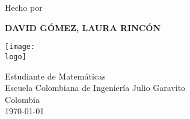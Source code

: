 \documentclass[twoside]{article}
\newcommand{\logo}{"C:/Users/usuario/OneDrive/Documentos/U/logo-eci.png"}
\renewcommand{\author}{David Gómez, Laura Rincón}
\renewcommand{\title}{Sumatorios}
\begin{document}
\begin{titlepage}
    \begin{center}
        \vspace*{1cm}
 
        \textbf{\fontsize{45}{\baselineskip}\selectfont{\title}}

        \vspace{3cm}

        {\Large Hecho por}

        \vspace{1cm}

        {\textbf{\LARGE\MakeUppercase{\author}}}

        \vspace{2cm}

        \texttt{[image: \\logo]}

        \vspace{2cm}

        {\Large Estudiante de Matemáticas\\[5pt]

        Escuela Colombiana de Ingeniería Julio Garavito\\[5pt]

        Colombia\\[5pt]

        \today}
             
    \end{center}
\end{titlepage}

\tableofcontents
\clearpage





\end{document}
